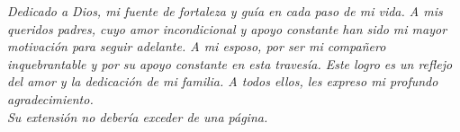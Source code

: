 \thispagestyle{empty}
\null\vfill
\begin{flushright}
  {\large{\textit{Dedicado a Dios, mi fuente de fortaleza y guía en cada paso de mi vida. A mis queridos padres, cuyo amor incondicional y apoyo constante han sido mi mayor motivación para seguir adelante. A mi esposo, por ser mi compañero inquebrantable y por su apoyo constante en esta travesía. Este logro es un reflejo del amor y la dedicación de mi familia. A todos ellos, les expreso mi profundo agradecimiento.\\
  Su extensión no debería exceder de una página.}}}
\end{flushright} %
